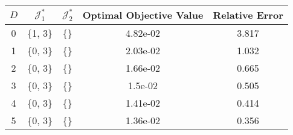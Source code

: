 \begin{subtable}{\textwidth}
\centering
\begin{tabular}{|c|c|c|c|c|}
  \hline
$D$ & $\mathcal J_1^*$ & $\mathcal J_2^*$ & Optimal Objective Value & Relative Error \\ 
  \hline
0 & \{1, 3\} & \{\} & 4.82e-02 & 3.817 \\ 
  1 & \{0, 3\} & \{\} & 2.03e-02 & 1.032 \\ 
  2 & \{0, 3\} & \{\} & 1.66e-02 & 0.665 \\ 
  3 & \{0, 3\} & \{\} & 1.5e-02 & 0.505 \\ 
  4 & \{0, 3\} & \{\} & 1.41e-02 & 0.414 \\ 
  5 & \{0, 3\} & \{\} & 1.36e-02 & 0.356 \\ 
   \hline
\end{tabular}
\end{subtable}

